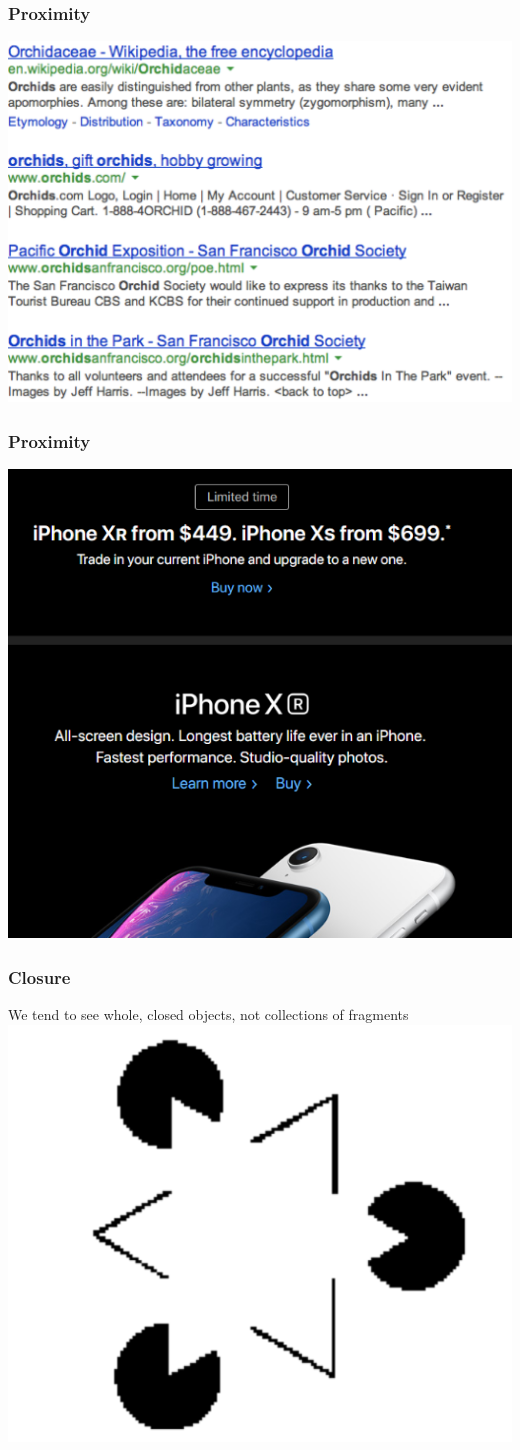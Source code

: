\documentclass{beamer}
\begin{document}
\begin{frame}
\frametitle{Proximity}
\centering
\includegraphics[width=0.8\linewidth]{image/proximity3}
\end{frame}

\begin{frame}
	\frametitle{Proximity}
	\centering
	\includegraphics[width=0.6\linewidth]{image/proximity4}
\end{frame}

\begin{frame}
\frametitle{Closure}
We tend to see whole, closed objects, not collections of fragments \newline
\centering
\includegraphics[width=0.5\linewidth]{image/closure}
\end{frame}
\end{document}
